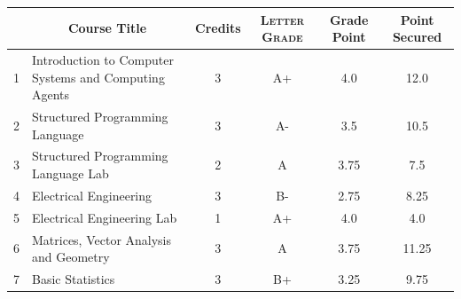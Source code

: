 \documentclass[11pt]{article}
\newcommand*{\numtwo}[1]{\pgfmathprintnumber[
                    fixed, precision=2, fixed zerofill=true]{#1}}
\begin{document}
                \begin{center}
                    \renewcommand{\arraystretch}{1.08}
                    
                \begin{tabular}{|c|l|c|>{\scshape}c|c|c|}
                \hline  \rule[-1ex]{0pt}{3.5ex} {\centering{\bf Course Code}} &  \multicolumn{1}{c|}{\textbf{Course Title}}  & {\bf Credits} & {\bf Letter Grade} & {\bf Grade Point} & {\bf Point Secured}  \\ 
                \hline   1 &  Introduction to Computer Systems and Computing Agents		 & 3 & A+ & 4.0 & 12.0 \\ %
                \hline   2 &  Structured Programming Language		 & 3 & A- & 3.5 & 10.5 \\ %
                \hline   3 &  Structured Programming Language Lab		 & 2 & A & 3.75 & 7.5 \\ %
                \hline   4 &  Electrical Engineering		 & 3 & B- & 2.75 & 8.25 \\ %
                \hline   5 &  Electrical Engineering Lab		 & 1 & A+ & 4.0 & 4.0 \\ %
                \hline   6 &  Matrices, Vector Analysis and Geometry		 & 3 & A & 3.75 & 11.25 \\ %
                \hline   7 &  Basic Statistics		 & 3 & B+ & 3.25 & 9.75 \\ %

\hline                %
                \end{tabular}
                \end{center}
                \renewcommand{\arraystretch}{1.03}
\end{document}
